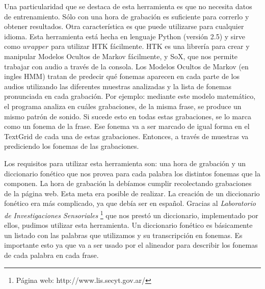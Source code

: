 
Una particularidad que se destaca de esta herramienta es que no necesita datos de entrenamiento. Sólo con una hora de grabación es suficiente para correrlo y obtener resultados. Otra característica es que puede utilizarse para cualquier idioma. Esta herramienta está hecha en lenguaje Python (versión 2.5) y sirve como $wrapper$ para utilizar HTK fácilmente. HTK es una librería para crear y manipular Modelos Ocultos de Markov fácilmente, y SoX, que nos permite trabajar con audio a través de la consola. Los Modelos Ocultos de Markov \cite{rabiner} (en ingles HMM) tratan de predecir qué fonemas aparecen en cada parte de los audios utilizando las diferentes muestras analizadas y la lista de fonemas pronunciada en cada grabación. Por ejemplo: mediante este modelo matemático, el programa analiza en cuáles grabaciones, de la misma frase, se produce un mismo patrón de sonido. Si sucede esto en todas estas grabaciones, se lo marca como un fonema de la frase. Ese fonema va a ser marcado de igual forma en el TextGrid de cada una de estas grabaciones. Entonces, a través de muestras va prediciendo los fonemas de las grabaciones.

Los requisitos para utilizar esta herramienta son: una hora de grabación y un diccionario fonético que nos provea para cada palabra los distintos fonemas que la componen. La hora de grabación la debíamos cumplir recolectando grabaciones de la página web. Esta meta era posible de realizar. La creación de un diccionario fonético era más complicado, ya que debía ser en español. Gracias al \textit{Laboratorio de Investigaciones Sensoriales} \footnote{Página web: http://www.lis.secyt.gov.ar/} que nos prestó un diccionario, implementado por ellos, pudimos utilizar esta herramienta. Un diccionario fonético es básicamente un listado con las palabras que utilizamos y su transcripción en fonemas. Es importante esto ya que va a ser usado por el alineador para describir los fonemas de cada palabra en cada frase.


